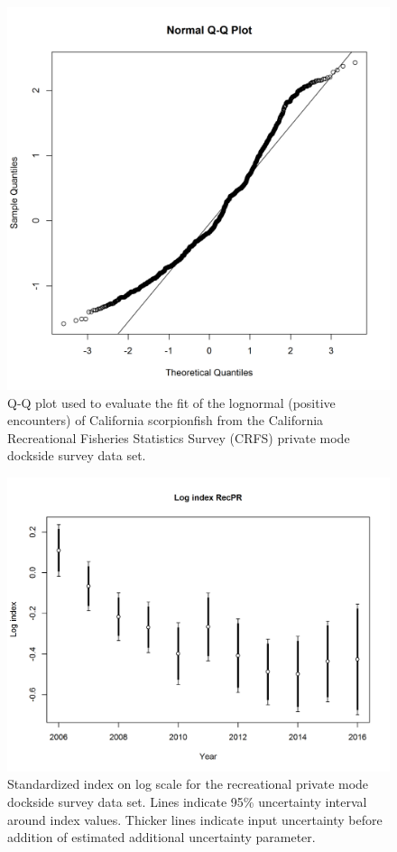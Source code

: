 \documentclass[12pt,]{article}
\begin{document}
\FloatBarrier 

\begin{figure}[htbp]
\centering
\includegraphics{Figures/Fleet4_RecPR_dockside_QQ.png}
\caption{Q-Q plot used to evaluate the fit of the lognormal (positive
encounters) of California scorpionfish from the California Recreational
Fisheries Statistics Survey (CRFS) private mode dockside survey data
set. \label{fig:Fleet4_RecPR_dockside_QQ}}
\end{figure}

\begin{figure}[htbp]
\centering
\includegraphics{r4ss/plots_mod1/index4_logcpuedata_RecPR.png}
\caption{Standardized index on log scale for the recreational private
mode dockside survey data set. Lines indicate 95\% uncertainty interval
around index values. Thicker lines indicate input uncertainty before
addition of estimated additional uncertainty parameter.
\label{fig:index4_logcpuedata_RecPR}}
\end{figure}
\end{document}
